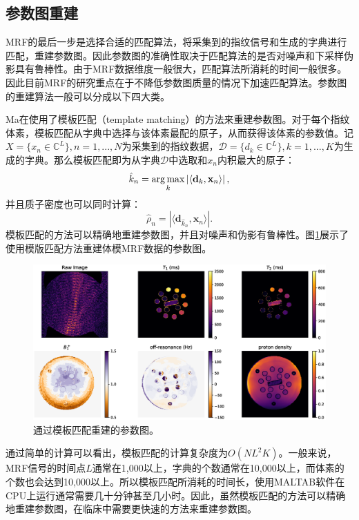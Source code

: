 \subsection{参数图重建}
MRF的最后一步是选择合适的匹配算法，将采集到的指纹信号和生成的字典进行匹配，重建参数图。因此参数图的准确性取决于匹配算法的是否对噪声和下采样伪影具有鲁棒性。由于MRF数据维度一般很大，匹配算法所消耗的时间一般很多。因此目前MRF的研究重点在于不降低参数图质量的情况下加速匹配算法。参数图的重建算法一般可以分成以下四大类。

Ma在\cite{mrf}使用了模板匹配（template matching）的方法来重建参数图。对于每个指纹体素，模板匹配从字典中选择与该体素最配的原子，从而获得该体素的参数值。记$X=\{x_n\in \mathbb{C}^L\}, n=1,...,N$为采集到的指纹数据，$\mathcal{D}=\{d_k\in \mathbb{C}^L\},k=1,...,K$为生成的字典。那么模板匹配即为从字典$\mathcal{D}$中选取和$x_n$内积最大的原子：
\begin{equation}
\hat{k}_n = \operatorname*{arg\,max}_k \left|\left\langle \mathbf{d}_k,\mathbf{x}_n \right\rangle \right|,
\end{equation}
并且质子密度也可以同时计算：
\begin{equation}
\hat{\rho}_n=\left|\langle \mathbf{d}_{\hat{k}_n},\mathbf{x}_n \rangle\right|.
\end{equation}
模板匹配的方法可以精确地重建参数图，并且对噪声和伪影有鲁棒性。图\ref{fig:mrfmap}展示了使用模版匹配方法重建体模MRF数据的参数图。
\begin{figure}[htbp]
\centering
\includegraphics[width=1\textwidth]{img/intro/mrfmap.eps}
\caption{通过模板匹配重建的参数图。}
\label{fig:mrfmap}
\end{figure}
通过简单的计算可以看出，模板匹配的计算复杂度为$O(NL^2K)$。一般来说，MRF信号的时间点$L$通常在1,000以上，字典的个数通常在10,000以上，而体素的个数也会达到10,000以上。所以模板匹配所消耗的时间长，使用MALTAB软件在CPU上运行通常需要几十分钟甚至几小时。因此，虽然模板匹配的方法可以精确地重建参数图，在临床中需要更快速的方法来重建参数图。

